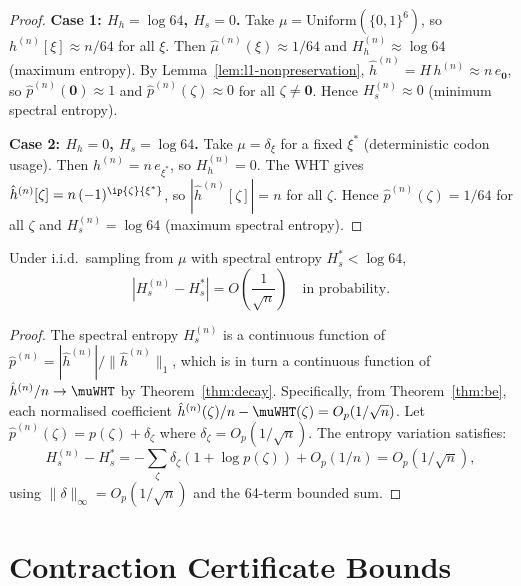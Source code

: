 \documentclass[12pt,letterpaper]{article}
\theoremstyle{definition}
\theoremstyle{plain}
\theoremstyle{remark}
\newcommand{\hhat}{\hat{h}}
\begin{document}
\begin{proof}
\textbf{Case 1: $H_h = \log 64$, $H_s = 0$.}
Take $\mu = \mathrm{Uniform}(\{0,1\}^6)$, so $h^{(n)}[\xi] \approx n/64$
for all $\xi$.  Then $\hat\mu^{(n)}(\xi) \approx 1/64$ and
$H_h^{(n)} \approx \log 64$ (maximum entropy).
By Lemma~\ref{lem:l1-nonpreservation},
$\hhat^{(n)} = H\,h^{(n)} \approx n\,e_{\mathbf{0}}$, so
$\hat{p}^{(n)}(\mathbf{0}) \approx 1$ and $\hat{p}^{(n)}(\zeta)\approx 0$
for all $\zeta \ne \mathbf{0}$.  Hence $H_s^{(n)} \approx 0$ (minimum
spectral entropy). \smallskip

\textbf{Case 2: $H_h = 0$, $H_s = \log 64$.}
Take $\mu = \delta_\xi$ for a fixed $\xi^*$ (deterministic codon usage).
Then $h^{(n)} = n\,e_{\xi^*}$, so $H_h^{(n)} = 0$.
The WHT gives $\hhat^{(n)}[\zeta] = n\,(-1)^{\ip{\zeta}{\xi^*}}$, so
$|\hhat^{(n)}[\zeta]| = n$ for all $\zeta$.  Hence
$\hat{p}^{(n)}(\zeta) = 1/64$ for all $\zeta$ and
$H_s^{(n)} = \log 64$ (maximum spectral entropy).
\end{proof}

\begin{proposition}
\label{prop:hs-rate}
Under i.i.d.\ sampling from $\mu$ with spectral entropy $H_s^* < \log 64$,
\[
  |H_s^{(n)} - H_s^*| = O\!\left(\frac{1}{\sqrt{n}}\right)
  \quad\text{in probability.}
\]
\end{proposition}

\begin{proof}
The spectral entropy $H_s^{(n)}$ is a continuous function of
$\hat{p}^{(n)} = |\hhat^{(n)}|/\|\hhat^{(n)}\|_1$, which is in turn
a continuous function of $\hhat^{(n)}/n \to \muWHT$ by
Theorem~\ref{thm:decay}.  Specifically, from Theorem~\ref{thm:be},
each normalised coefficient $\hhat^{(n)}(\zeta)/n - \muWHT(\zeta) = O_p(1/\sqrt{n})$.
Let $\hat{p}^{(n)}(\zeta) = p(\zeta) + \delta_\zeta$ where $\delta_\zeta = O_p(1/\sqrt{n})$.
The entropy variation satisfies:
\[
  H_s^{(n)} - H_s^*
    = -\sum_\zeta \delta_\zeta(1+\log p(\zeta)) + O_p(1/n)
    = O_p(1/\sqrt{n}),
\]
using $\|\delta\|_\infty = O_p(1/\sqrt{n})$ and the 64-term bounded sum.
\end{proof}

\section{Contraction Certificate Bounds}
\end{document}
